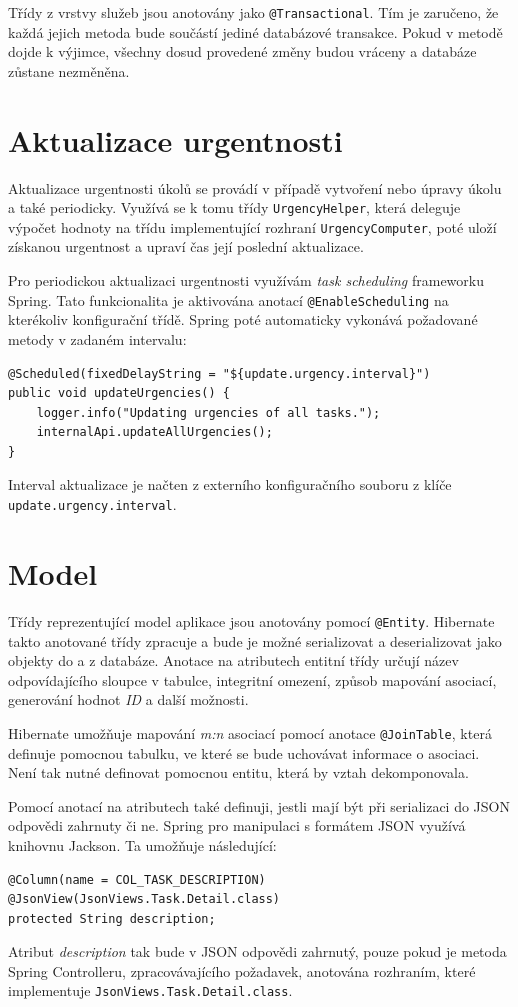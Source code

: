 \documentclass[thesis=B,czech]{FITthesis}[2012/06/26]
\begin{document}
		Třídy z vrstvy služeb jsou anotovány jako \texttt{@Transactional}. Tím je zaručeno, že každá jejich metoda bude součástí jediné databázové transakce. Pokud v metodě dojde k výjimce, všechny dosud provedené změny budou vráceny a databáze zůstane nezměněna.
	
	\section{Aktualizace urgentnosti}
		Aktualizace urgentnosti úkolů se provádí v případě vytvoření nebo úpravy úkolu a také periodicky. Využívá se k tomu třídy \texttt{UrgencyHelper}, která deleguje výpočet hodnoty na třídu implementující rozhraní \texttt{UrgencyComputer}, poté uloží získanou urgentnost a upraví čas její poslední aktualizace.
		
		Pro periodickou aktualizaci urgentnosti využívám \textit{task scheduling} frameworku Spring. Tato funkcionalita je aktivována anotací \texttt{@EnableScheduling} na kterékoliv konfigurační třídě. Spring poté automaticky vykonává požadované metody v zadaném intervalu:
		\begin{Verbatim}
@Scheduled(fixedDelayString = "${update.urgency.interval}")
public void updateUrgencies() {
	logger.info("Updating urgencies of all tasks.");
	internalApi.updateAllUrgencies();
}
		\end{Verbatim}
		Interval aktualizace je načten z externího konfiguračního souboru z klíče \texttt{update.urgency.interval}.
	
	\section{Model}
		Třídy reprezentující model aplikace jsou anotovány pomocí \texttt{@Entity}. Hibernate takto anotované třídy zpracuje a bude je možné serializovat a deserializovat jako objekty do a z databáze. Anotace na atributech entitní třídy určují název odpovídajícího sloupce v tabulce, integritní omezení, způsob mapování asociací, generování hodnot \textit{ID} a další možnosti.
		
		Hibernate umožňuje mapování \textit{m:n} asociací pomocí anotace \texttt{@JoinTable}, která definuje pomocnou tabulku, ve které se bude uchovávat informace o asociaci. Není tak nutné definovat pomocnou entitu, která by vztah dekomponovala.
		
		Pomocí anotací na atributech také definuji, jestli mají být při serializaci do JSON odpovědi zahrnuty či ne. Spring pro manipulaci s formátem JSON využívá knihovnu Jackson. Ta umožňuje následující:
		\begin{Verbatim}
@Column(name = COL_TASK_DESCRIPTION)
@JsonView(JsonViews.Task.Detail.class)
protected String description;
		\end{Verbatim}
		Atribut \textit{description} tak bude v JSON odpovědi zahrnutý, pouze pokud je metoda Spring Controlleru, zpracovávajícího požadavek, anotována rozhraním, které implementuje \texttt{JsonViews.\allowbreak Task.\allowbreak Detail.\allowbreak class}.
	
\end{document}
